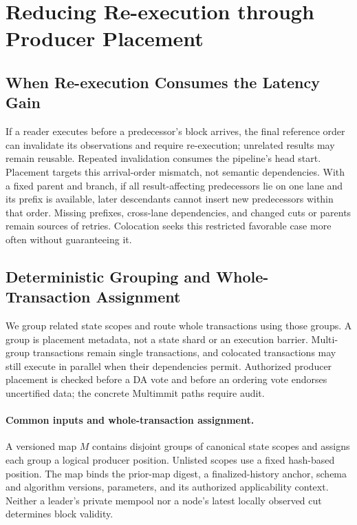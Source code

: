 \section{Reducing Re-execution through Producer Placement}
\label{sec:placement}

\subsection{When Re-execution Consumes the Latency Gain}

If a reader executes before a predecessor's block arrives, the final reference order can invalidate its observations and require re-execution; unrelated results may remain reusable. Repeated invalidation consumes the pipeline's head start. Placement targets this arrival-order mismatch, not semantic dependencies. With a fixed parent and branch, if all result-affecting predecessors lie on one lane and its prefix is available, later descendants cannot insert new predecessors within that order. Missing prefixes, cross-lane dependencies, and changed cuts or parents remain sources of retries. Colocation seeks this restricted favorable case more often without guaranteeing it.

\subsection{Deterministic Grouping and Whole-Transaction Assignment}

We group related state scopes and route whole transactions using those groups. A group is placement metadata, not a state shard or an execution barrier. Multi-group transactions remain single transactions, and colocated transactions may still execute in parallel when their dependencies permit. Authorized producer placement is checked before a DA vote and before an ordering vote endorses uncertified data; the concrete Multimmit paths require audit.

\paragraph{Common inputs and whole-transaction assignment.}
A versioned map \(M\) contains disjoint groups of canonical state scopes and assigns each group a logical producer position. Unlisted scopes use a fixed hash-based position. The map binds the prior-map digest, a finalized-history anchor, schema and algorithm versions, parameters, and its authorized applicability context. Neither a leader's private mempool nor a node's latest locally observed cut determines block validity.

